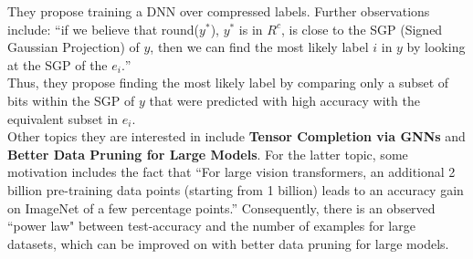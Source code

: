 \documentclass[12pt]{amsart}
\begin{document}
They propose training a DNN over compressed labels. Further observations include:
``if we believe that round($y^{\ast}$), $y^{\ast}$ is in $R^c$, is close to the SGP (Signed Gaussian Projection) of $y$, then we can find the most likely label $i$ in $y$ by looking at the SGP of the $e_i.$'' \\

Thus, they propose finding the most likely label by comparing only a subset of bits within the SGP of $y$ that were predicted with high accuracy with the equivalent subset in $e_i$. \\

Other topics they are interested in include \textbf{Tensor Completion via GNNs} and \textbf{Better Data Pruning for Large Models}. For the latter topic, some motivation includes the fact that ``For large vision transformers, an additional 2 billion pre-training data points (starting from 1 billion) leads to an accuracy gain on ImageNet of a few percentage points.'' 
Consequently, there is an observed ``power law" between test-accuracy and the number of examples for large datasets, which can be improved on with better data pruning for large models.
\end{document}
